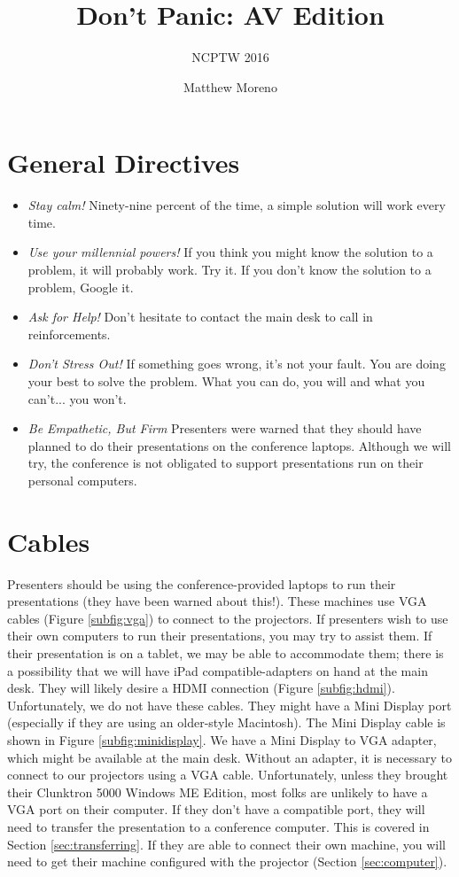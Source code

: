 \documentclass{scrartcl}
\title{Don't Panic: AV Edition}
\subtitle{NCPTW 2016}
\author{Matthew Moreno}
\begin{document}
\maketitle

\section{General Directives}
\begin{itemize}
  \item \textit{Stay calm!} Ninety-nine percent of the time, a simple solution will work every time.
  \item \textit{Use your millennial powers!} If you think you might know the solution to a problem, it will probably work. Try it. If you don't know the solution to a problem, Google it.
  \item \textit{Ask for Help!} Don't hesitate to contact the main desk to call in reinforcements.
  \item \textit{Don't Stress Out!} If something goes wrong, it's not your fault. You are doing your best to solve the problem. What you can do, you will and what you can't... you won't.
  \item \textit{Be Empathetic, But Firm} Presenters were warned that they should have planned to do their presentations on the conference laptops. Although we will try, the conference is not obligated to support presentations run on their personal computers.
\end{itemize}

\section{Cables}
Presenters should be using the conference-provided laptops to run their presentations (they have been warned about this!). These machines use VGA cables (Figure \ref{subfig:vga}) to connect to the projectors. If presenters wish to use their own computers to run their presentations, you may try to assist them. If their presentation is on a tablet, we may be able to accommodate them; there is a possibility that we will have iPad compatible-adapters on hand at the main desk. They will likely desire a HDMI connection (Figure \ref{subfig:hdmi}). Unfortunately, we do not have these cables. They might have a Mini Display port (especially if they are using an older-style Macintosh). The Mini Display cable is shown in Figure \ref{subfig:minidisplay}. We have a Mini Display to VGA adapter, which might be available at the main desk. Without an adapter, it is necessary to connect to our projectors using a VGA cable. Unfortunately, unless they brought their Clunktron 5000 Windows ME Edition, most folks are unlikely to have a VGA port on their computer. If they don't have a compatible port, they will need to transfer the presentation to a conference computer. This is covered in Section \ref{sec:transferring}. If they are able to connect their own machine, you will need to get their machine configured with the projector (Section \ref{sec:computer}).
\end{document}
